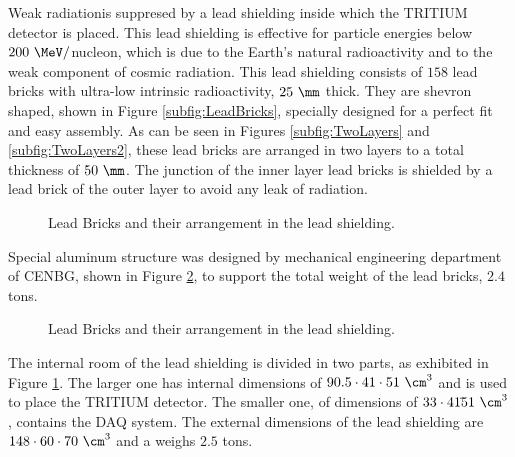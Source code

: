 Weak radiationis suppresed by a lead shielding inside which the TRITIUM detector is placed. This lead shielding is effective for particle energies below $200~\MeV/$nucleon, which is due to the Earth's natural radioactivity and to the weak component of cosmic radiation. This lead shielding consists of $158$ lead bricks with ultra-low intrinsic radioactivity, $25~\mm$ thick. They are shevron shaped, shown in Figure \ref{subfig:LeadBricks}, specially designed for a perfect fit and easy assembly. As can be seen in Figures \ref{subfig:TwoLayers} and \ref{subfig:TwoLayers2}, these lead bricks are arranged in two layers to a total thickness of $50~\mm$. The junction of the inner layer lead bricks is shielded by a lead brick of the outer layer to avoid any leak of radiation.

\begin{figure}[htbp]
 \centering
 \caption{Lead Bricks and their arrangement in the lead shielding.}
 \label{fig:LeadBricksAndArrangement}
\end{figure}

Special aluminum structure was designed by mechanical engineering department of CENBG, shown in Figure \ref{fig:AluminiumStructure}, to support the total weight of the lead bricks, $2.4$ tons.

\begin{figure}[htbp]
 \centering
    \caption{Lead Bricks and their arrangement in the lead shielding.}
 \label{fig:AluminiumStructure}
\end{figure}

The internal room of the lead shielding is divided in two parts, as exhibited in Figure \ref{fig:LeadBricksAndArrangement}. The larger one has internal dimensions of $90.5 \cdot{} 41 \cdot{} 51~\cm^3$ and is used to place the TRITIUM detector. The smaller one, of dimensions of $33 \cdot{} 41 \dot{} 51~\cm^3$, contains the DAQ system. The external dimensions of the lead shielding are $148 \cdot{} 60 \cdot{} 70~\cm^3$ and a weighs $2.5$ tons.